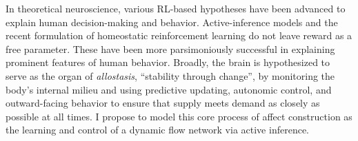 \begin{singlespace}
\im
In theoretical neuroscience, various RL-based hypotheses have been advanced
to explain human decision-making and behavior.  Active-inference models and
the recent formulation of homeostatic reinforcement learning do not leave
reward as a free parameter\cite{Keramati2014,Pezzulo2018,Morville2018a}.
These have been more parsimoniously successful in explaining prominent
features of human behavior.  Broadly, the brain is hypothesized to serve
as the organ of \emph{allostasis}, ``stability through change'', by
monitoring the body's internal milieu and using predictive updating,
autonomic control, and outward-facing behavior to ensure that supply meets
demand as closely as possible at all times\cite{Barrett2015,BarrettTheoryOfConstructed2017,Kleckner2017}. I
propose to model this core process of affect construction as the learning
and control of a dynamic flow network via active inference.
\end{singlespace}

